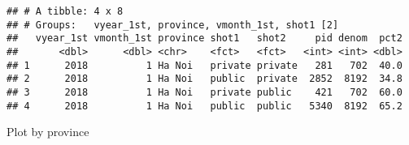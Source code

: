\documentclass[
]{article}
\newenvironment{Shaded}{\begin{snugshade}}{\end{snugshade}}
\newcommand{\AttributeTok}[1]{\textcolor[rgb]{0.77,0.63,0.00}{#1}}
\newcommand{\CommentTok}[1]{\textcolor[rgb]{0.56,0.35,0.01}{\textit{#1}}}
\newcommand{\FunctionTok}[1]{\textcolor[rgb]{0.00,0.00,0.00}{#1}}
\newcommand{\NormalTok}[1]{#1}
\newcommand{\OtherTok}[1]{\textcolor[rgb]{0.56,0.35,0.01}{#1}}
\newcommand{\SpecialCharTok}[1]{\textcolor[rgb]{0.00,0.00,0.00}{#1}}
\newcommand{\StringTok}[1]{\textcolor[rgb]{0.31,0.60,0.02}{#1}}
\begin{document}
\begin{verbatim}
## # A tibble: 4 x 8
## # Groups:   vyear_1st, province, vmonth_1st, shot1 [2]
##   vyear_1st vmonth_1st province shot1   shot2     pid denom  pct2
##       <dbl>      <dbl> <chr>    <fct>   <fct>   <int> <int> <dbl>
## 1      2018          1 Ha Noi   private private   281   702  40.0
## 2      2018          1 Ha Noi   public  private  2852  8192  34.8
## 3      2018          1 Ha Noi   private public    421   702  60.0
## 4      2018          1 Ha Noi   public  public   5340  8192  65.2
\end{verbatim}

Plot by province

\begin{Shaded}
\end{Shaded}
\end{document}
